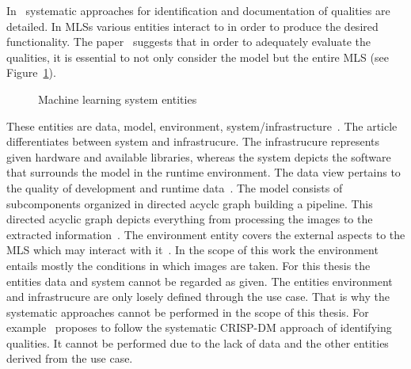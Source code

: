 In~\cite{nakamichi_requirements-driven_2020,siebert_construction_2021} systematic approaches for
identification and documentation of qualities are detailed.
In \acp{MLS} various entities interact to in order to produce the desired functionality.
The paper~\cite{nakamichi_requirements-driven_2020} suggests that in order to adequately evaluate
the qualities, it is essential to not only consider the model but the entire \ac{MLS}
(see Figure~\ref{fig:MLS}).
\begin{figure}[ht]
    \centering
    
    \caption[Machine learning system entities]{%
        Machine learning system entities~\citep{nakamichi_requirements-driven_2020}\label{fig:MLS}
    }
\end{figure}
These entities are data, model, environment,
system/infrastructure~\citep{nakamichi_requirements-driven_2020, siebert_construction_2021}.
The article~\cite{siebert_construction_2021} differentiates between system and infrastrucure.
The infrastrucure represents given hardware and available libraries, whereas the system depicts
the software that surrounds the model in the runtime environment.
The data view pertains to the quality of development and runtime
data~\citep{siebert_construction_2021}.
The model consists of subcomponents organized in directed acyclc graph building a
pipeline.
This directed acyclic graph depicts everything from processing the images to the extracted
information~\citep{siebert_construction_2021}.
The environment entity covers the external aspects to the \ac{MLS} which may interact with
it~\citep{siebert_construction_2021}.
In the scope of this work the environment entails mostly the conditions in which images are taken.
For this thesis the entities data and system cannot be regarded as given.
The entities environment and infrastrucure are only losely defined through the use case.
That is why the systematic approaches cannot be performed in the scope of this thesis.
For example~\cite{siebert_construction_2021} proposes to follow the systematic CRISP-DM approach of
identifying qualities.
It cannot be performed due to the lack of data and the other entities derived from the use case.

